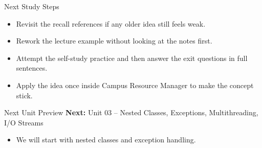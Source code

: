 \documentclass{beamer}
\begin{document}
\begin{frame}{Next Study Steps}
\begin{itemize}[<+->]
  \item Revisit the recall references if any older idea still feels weak.
  \item Rework the lecture example without looking at the notes first.
  \item Attempt the self-study practice and then answer the exit questions in full sentences.
  \item Apply the idea once inside Campus Resource Manager to make the concept stick.
\end{itemize}
  \slidesources{\OOPSUnitIISources}
\end{frame}

\begin{frame}{Next Unit Preview}
  \textbf{Next:} Unit 03 -- Nested Classes, Exceptions, Multithreading, I/O Streams
  \vspace{0.6em}
  \begin{itemize}[<+->]
    \item We will start with nested classes and exception handling.
  \end{itemize}
  \slidesources{\OOPSUnitIISources}
\end{frame}
\end{document}

